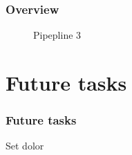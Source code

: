 \documentclass{beamer}
\begin{document}
\begin{frame} %
	\frametitle{Overview} %
	\begin{figure}[h]
		\centering
		\caption{Pipepline 3}
	\end{figure}
\end{frame}

\section{Future tasks}
\begin{frame} %
	\frametitle{Future tasks} %
	Set dolor
\end{frame}
\end{document}
